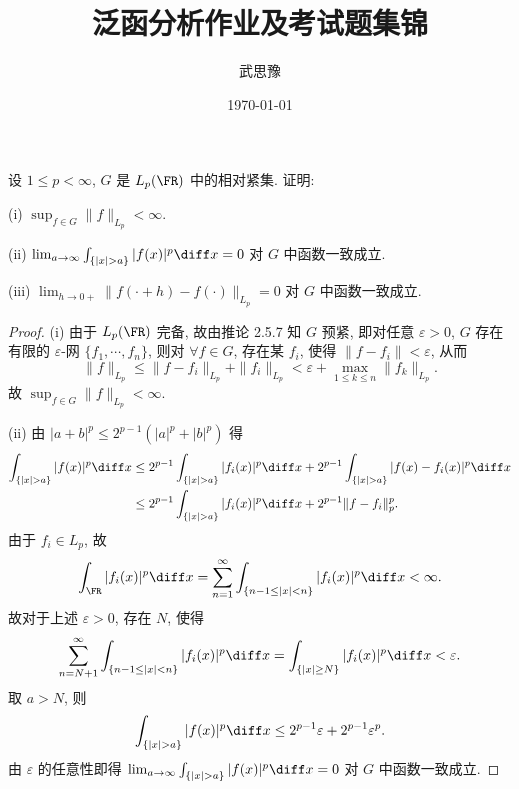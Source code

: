 \documentclass{mathexercise}
\title{泛函分析作业及考试题集锦}
\author{武思豫}
\date{\today}
\begin{document}
    

\maketitle

\begin{exercise}
    设 $1\leq p<\infty$, $G$ 是 $L_p(\FR)$ 中的相对紧集. 证明:

    (i) $\sup_{f\in G}\|f\|_{L_p}<\infty$.

    (ii) $\lim_{a\to\infty}\int_{\{|x|>a\}} |f(x)|^p \diff x=0$ 对 $G$ 中函数一致成立.

    (iii) $\lim_{h\to 0+}\|f(\cdot+h)-f(\cdot)\|_{L_p}=0$ 对 $G$ 中函数一致成立.
\end{exercise}


\begin{proof}
    (i) 由于 $L_p(\FR)$ 完备, 故由推论 2.5.7 知 $G$ 预紧, 即对任意 $\varepsilon>0$,
    $G$ 存在有限的 $\varepsilon$-网 $\{f_1,\cdots,f_n\}$,
    则对 $\forall f\in G$, 存在某 $f_i$, 使得 $\|f-f_i\|<\varepsilon$, 从而
    \[\|f\|_{L_p}\leq\|f-f_i\|_{L_p}+\|f_i\|_{L_p}<\varepsilon+\max_{1\leq k\leq n}\|f_k\|_{L_p}.\]
    故 $\sup_{f\in G}\|f\|_{L_p}<\infty$.

    (ii) 由 $|a+b|^p\leq 2^{p-1}\left(|a|^p+|b|^p\right)$ 得
    \begin{align*}
        \int_{\{|x|>a\}}|f(x)|^p\diff x
        & \leq 2^{p-1}\int_{\{|x|>a\}}|f_i(x)|^p\diff x+2^{p-1}\int_{\{|x|>a\}}|f(x)-f_i(x)|^p\diff x \\
        & \leq 2^{p-1}\int_{\{|x|>a\}}|f_i(x)|^p\diff x+2^{p-1}\|f-f_i\|_p^p.
    \end{align*}
    由于 $f_i\in L_p$, 故
    \[\int_{\FR}|f_i(x)|^p\diff x=\sum_{n=1}^{\infty}\int_{\{n-1\leq |x|<n\}}|f_i(x)|^p\diff x<\infty.\]
    故对于上述 $\varepsilon>0$, 存在 $N$, 使得
    \[\sum_{n=N+1}^{\infty}\int_{\{n-1\leq |x|<n\}}|f_i(x)|^p\diff x=\int_{\{|x|\geq N\}}|f_i(x)|^p\diff x<\varepsilon.\]
    取 $a>N$, 则
    \[\int_{\{|x|>a\}}|f(x)|^p\diff x\leq 2^{p-1}\varepsilon+2^{p-1}\varepsilon^p.\]
    由 $\varepsilon$ 的任意性即得 $\lim_{a\to\infty}\int_{\{|x|>a\}}|f(x)|^p\diff x=0$ 对 $G$ 中函数一致成立.


\end{proof}
\end{document}

